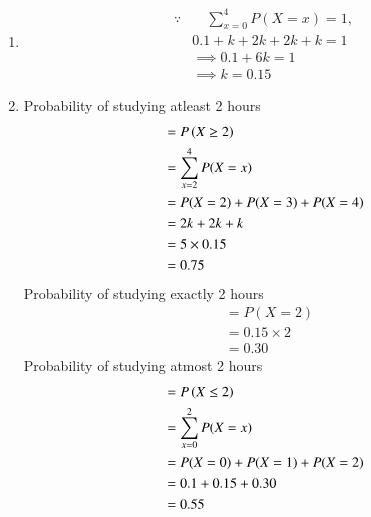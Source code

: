 \begin{enumerate}
\item 
\begin{align}
    \because & \quad \sum_{x=0}^4 P(X=x) = 1,\\
    & 0.1 + k +2k +2k +k = 1\\
    &\implies 0.1 +6k = 1\\
    &\implies k = 0.15
\end{align}
\item 
Probability of studying atleast 2 hours
\begin{align}
    &= P\left(X\ge 2\right)\\
    &=\sum_{x=2}^4 P(X=x)\\
    &= P(X=2)+ P(X=3) +P(X=4)\\
    &= 2k + 2k +k\\
    &= 5 \times 0.15\\
    &= 0.75
\end{align}
Probability of studying exactly 2 hours
\begin{align}
    &=P(X=2)\\
    &= 0.15 \times 2\\
    &= 0.30
\end{align}
Probability of studying atmost 2 hours
\begin{align}
    &= P\left(X\le 2\right)\\ 
    &=\sum_{x=0}^2 P(X=x)\\
    &= P(X=0) + P(X=1)+ P(X=2)\\
    &= 0.1 + 0.15 +0.30\\
    &=0.55
\end{align}
\end{enumerate}